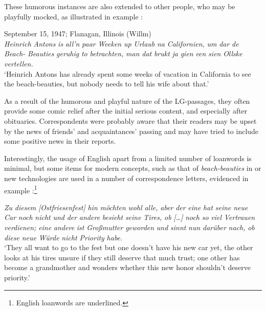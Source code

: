 \documentclass[output=paper]{langsci/langscibook}
\begin{document}
These humorous instances are also extended to other people, who may be playfully mocked, as illustrated in example :

  
\ea
\label{ex:rocker:13} 
September 15, 1947; Flanagan, Illinois (Willm)\\
  
\textit{Heinrich} \textit{Antons} \textit{is} \textit{all’n} \textit{paar} \textit{Weeken} \textit{up} \textit{Urlaub} \textit{na} \textit{Californien,} \textit{um} \textit{dar} \textit{de} \textit{Beach-} \textit{Beauties} \textit{geruhig} \textit{to} \textit{betrachten,} \textit{man} \textit{dat} \textit{brukt} \textit{ja} \textit{gien} \textit{een} \textit{sien} \textit{Ollske} \textit{vertellen.}\\

‘Heinrich Antons has already spent some weeks of vacation in California to see the  beach-beauties, but nobody needs to tell his wife about that.’
\z

As a result of the humorous and playful nature of the LG-passages, they often provide some comic relief after the initial serious content, and especially after obituaries. Correspondents were probably aware that their readers may be upset by the news of friends’ and acquaintances’ passing and may have tried to include some positive news in their reports. 

Interestingly, the usage of English apart from a limited number of loanwords is minimal, but some items for modern concepts, such as that of \textit{beach-beauties} in  or new technologies are used in a number of correspondence letters, evidenced in example :\footnote{English loanwords are underlined.}
 
\ea
\label{ex:rocker:14} 
\textit{Zu} \textit{diesem} \textit{[Ostfriesenfest]} \textit{hin} \textit{möchten} \textit{wohl} \textit{alle,} \textit{aber} \textit{der} \textit{eine} \textit{hat} \textit{seine} \textit{neue} \textit{Car} \textit{noch} \textit{nicht} \textit{und} \textit{der} \textit{andere} \textit{besieht} \textit{seine} \textit{Tires,} \textit{ob} \textit{[…]} \textit{noch} \textit{so} \textit{viel} \textit{Vertrauen} \textit{verdienen;} \textit{eine} \textit{andere} \textit{ist} \textit{Großmutter} \textit{geworden} \textit{und} \textit{sinnt} \textit{nun} \textit{darüber} \textit{nach,} \textit{ob} \textit{diese} \textit{neue} \textit{Würde} \textit{nicht} \textit{Priority} \textit{habe.}\\

‘They all want to go to the fest but one doesn’t have his new car yet, the other looks at his tires unsure if they still deserve that much trust; one other has become a grandmother and wonders whether this new honor shouldn’t deserve priority.'
\z 
\end{document}
